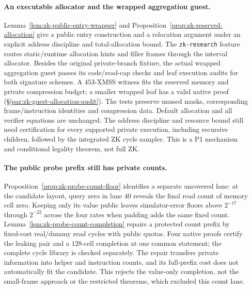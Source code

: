 \paragraph{An executable allocator and the wrapped aggregation guest.} Lemma~\ref{lem:zk-public-entry-wrapper} and Proposition~\ref{prop:zk-reserved-allocation} give a public entry construction and a relocation argument under an explicit address discipline and total-allocation bound. The \texttt{zk-research} feature routes static/runtime allocation hints and filler frames through the interval allocator. Besides the original private-branch fixture, the actual wrapped aggregation guest passes its code/read-cap checks and leaf execution audits for both signature schemes. A $453$-XMSS witness fits the reserved memory and private compression budget; a smaller wrapped leaf has a valid native proof (\S\ref{par:zk-guest-allocation-audit}). The tests preserve unused masks, corresponding frame/instruction identities and compression data. Default allocation and all verifier equations are unchanged. The address discipline and resource bound still need certification for every supported private execution, including recursive children, followed by the integrated ZK cycle sampler. This is a P1 mechanism and conditional legality theorem, not full ZK.

\paragraph{The public probe prefix still has private counts.} Proposition~\ref{prop:zk-probe-count-floor} identifies a separate uncovered lane: at the candidate layout, query zero in lane $40$ reveals the final read count of memory cell zero. Keeping only its value public leaves simulator-error floors above $2^{-17}$ through $2^{-22}$ across the four rates when padding adds the same fixed count. Lemma~\ref{lem:zk-probe-count-completion} repairs a protected count prefix by fixed-cost real/dummy read cycles with public quotas. Four native proofs certify the leaking pair and a $128$-cell completion at one common statement; the complete cycle library is checked separately. The repair transfers private information into helper and instruction counts, and its full-prefix cost does not automatically fit the candidate. This rejects the value-only completion, not the small-frame approach or the restricted theorems, which excluded this count lane.

